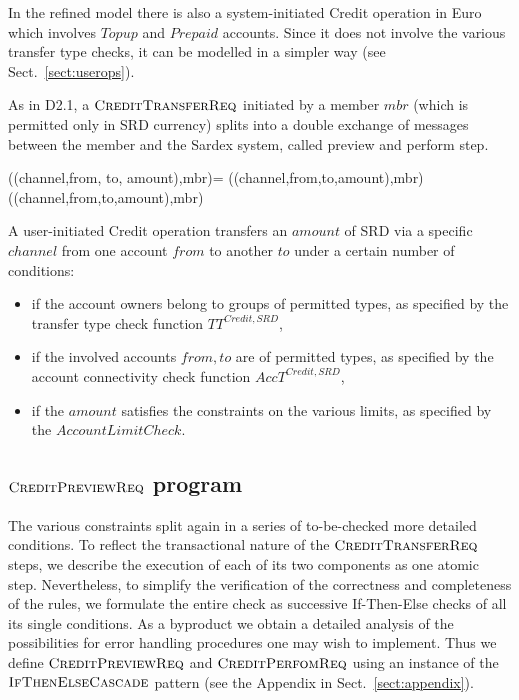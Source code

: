In the refined model there is also a system-initiated Credit operation in Euro which involves $Topup$ and $Prepaid$ accounts. Since it does not involve the various transfer type checks, it can be modelled in a simpler way (see Sect.~\ref{sect:userops}).

As in D2.1, a $\hbox{\sc CreditTransferReq}$ initiated by a member $mbr$ (which is permitted only in SRD currency) splits into a double exchange of messages between the member and the Sardex system, called preview and perform step.

\begin{asm}
((channel,from, to, amount),mbr)=\+
   ((channel,from,to,amount),mbr)  \\
   ((channel,from,to,amount),mbr) 
\end{asm}


A user-initiated Credit operation transfers an $amount$ of SRD via a specific $channel$ from one account $from$ to another $to$ under a certain number of conditions:

\begin{itemize}
	\item if the account owners belong to groups of permitted types, as specified by the transfer type check function $TT^{Credit,SRD}$, 
	\item if the involved accounts $from,to$ are of permitted types, as specified by  the account connectivity check function $AccT^{Credit,SRD}$, 
	\item if the $amount$ satisfies the constraints on the various limits, as specified by the $AccountLimitCheck$.
\end{itemize}


\subsection{ $\hbox{\sc CreditPreviewReq}$ program}
\label{sect:creditpreview}

The various constraints split again in a series of to-be-checked  more detailed 
conditions. 
To reflect the transactional nature of the $\hbox{\sc CreditTransferReq}$ steps, we describe the execution of each of its two components as one atomic step. Nevertheless, to simplify the verification of the correctness and completeness of the rules, we formulate the entire
check as successive If-Then-Else checks of all its single conditions. As a byproduct we obtain a detailed analysis of the possibilities for error handling procedures one may wish to implement. Thus we define  $\hbox{\sc CreditPreviewReq}$ and $\hbox{\sc CreditPerfomReq}$ using an instance of the $\hbox{\sc IfThenElseCascade}$ pattern (see the Appendix in Sect.~\ref{sect:appendix}). 

